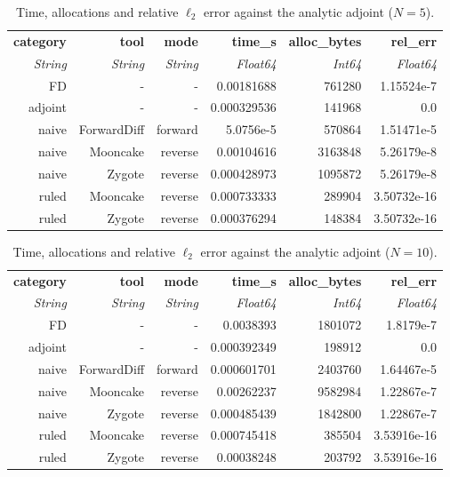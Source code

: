 \begin{table}[H]
  \centering
  \caption{Time, allocations and relative $\ell_2$ error against the analytic adjoint ($N = 5$).}
  \label{tab:scaling-N5}
\begin{tabular}{rrrrrr}
  \toprule
  \textbf{category} & \textbf{tool} & \textbf{mode} & \textbf{time\_s} & \textbf{alloc\_bytes} & \textbf{rel\_err} \\
  \textit{String} & \textit{String} & \textit{String} & \textit{Float64} & \textit{Int64} & \textit{Float64} \\
  \midrule
  FD & - & - & 0.00181688 & 761280 & 1.15524e-7 \\
  adjoint & - & - & 0.000329536 & 141968 & 0.0 \\
  naive & ForwardDiff & forward & 5.0756e-5 & 570864 & 1.51471e-5 \\
  naive & Mooncake & reverse & 0.00104616 & 3163848 & 5.26179e-8 \\
  naive & Zygote & reverse & 0.000428973 & 1095872 & 5.26179e-8 \\
  ruled & Mooncake & reverse & 0.000733333 & 289904 & 3.50732e-16 \\
  ruled & Zygote & reverse & 0.000376294 & 148384 & 3.50732e-16 \\
  \bottomrule
\end{tabular}
\end{table}
\begin{table}[H]
  \centering
  \caption{Time, allocations and relative $\ell_2$ error against the analytic adjoint ($N = 10$).}
  \label{tab:scaling-N10}
\begin{tabular}{rrrrrr}
  \toprule
  \textbf{category} & \textbf{tool} & \textbf{mode} & \textbf{time\_s} & \textbf{alloc\_bytes} & \textbf{rel\_err} \\
  \textit{String} & \textit{String} & \textit{String} & \textit{Float64} & \textit{Int64} & \textit{Float64} \\
  \midrule
  FD & - & - & 0.0038393 & 1801072 & 1.8179e-7 \\
  adjoint & - & - & 0.000392349 & 198912 & 0.0 \\
  naive & ForwardDiff & forward & 0.000601701 & 2403760 & 1.64467e-5 \\
  naive & Mooncake & reverse & 0.00262237 & 9582984 & 1.22867e-7 \\
  naive & Zygote & reverse & 0.000485439 & 1842800 & 1.22867e-7 \\
  ruled & Mooncake & reverse & 0.000745418 & 385504 & 3.53916e-16 \\
  ruled & Zygote & reverse & 0.00038248 & 203792 & 3.53916e-16 \\
  \bottomrule
\end{tabular}
\end{table}
